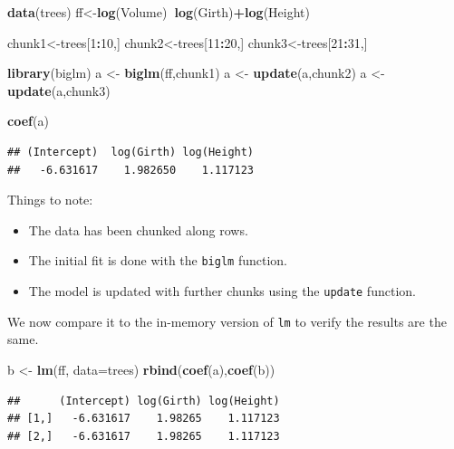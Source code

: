 \documentclass[]{book}
\newenvironment{Shaded}{\begin{snugshade}}{\end{snugshade}}
\newcommand{\KeywordTok}[1]{\textcolor[rgb]{0.13,0.29,0.53}{\textbf{#1}}}
\newcommand{\DataTypeTok}[1]{\textcolor[rgb]{0.13,0.29,0.53}{#1}}
\newcommand{\DecValTok}[1]{\textcolor[rgb]{0.00,0.00,0.81}{#1}}
\newcommand{\StringTok}[1]{\textcolor[rgb]{0.31,0.60,0.02}{#1}}
\newcommand{\OperatorTok}[1]{\textcolor[rgb]{0.81,0.36,0.00}{\textbf{#1}}}
\newcommand{\NormalTok}[1]{#1}
\providecommand{\tightlist}{%
  \setlength{\itemsep}{0pt}\setlength{\parskip}{0pt}}
\theoremstyle{definition}
\theoremstyle{definition}
\theoremstyle{definition}
\theoremstyle{remark}
\begin{document}
\begin{Shaded}
\begin{Highlighting}[]
\KeywordTok{data}\NormalTok{(trees)}
\NormalTok{ff<-}\KeywordTok{log}\NormalTok{(Volume)}\OperatorTok{~}\KeywordTok{log}\NormalTok{(Girth)}\OperatorTok{+}\KeywordTok{log}\NormalTok{(Height)}

\NormalTok{chunk1<-trees[}\DecValTok{1}\OperatorTok{:}\DecValTok{10}\NormalTok{,]}
\NormalTok{chunk2<-trees[}\DecValTok{11}\OperatorTok{:}\DecValTok{20}\NormalTok{,]}
\NormalTok{chunk3<-trees[}\DecValTok{21}\OperatorTok{:}\DecValTok{31}\NormalTok{,]}

\KeywordTok{library}\NormalTok{(biglm)}
\NormalTok{a <-}\StringTok{ }\KeywordTok{biglm}\NormalTok{(ff,chunk1)}
\NormalTok{a <-}\StringTok{ }\KeywordTok{update}\NormalTok{(a,chunk2)}
\NormalTok{a <-}\StringTok{ }\KeywordTok{update}\NormalTok{(a,chunk3)}

\KeywordTok{coef}\NormalTok{(a)}
\end{Highlighting}
\end{Shaded}

\begin{verbatim}
## (Intercept)  log(Girth) log(Height) 
##   -6.631617    1.982650    1.117123
\end{verbatim}

Things to note:

\begin{itemize}
\tightlist
\item
  The data has been chunked along rows.
\item
  The initial fit is done with the \texttt{biglm} function.
\item
  The model is updated with further chunks using the \texttt{update}
  function.
\end{itemize}

We now compare it to the in-memory version of \texttt{lm} to verify the
results are the same.

\begin{Shaded}
\begin{Highlighting}[]
\NormalTok{b <-}\StringTok{ }\KeywordTok{lm}\NormalTok{(ff, }\DataTypeTok{data=}\NormalTok{trees)}
\KeywordTok{rbind}\NormalTok{(}\KeywordTok{coef}\NormalTok{(a),}\KeywordTok{coef}\NormalTok{(b))}
\end{Highlighting}
\end{Shaded}

\begin{verbatim}
##      (Intercept) log(Girth) log(Height)
## [1,]   -6.631617    1.98265    1.117123
## [2,]   -6.631617    1.98265    1.117123
\end{verbatim}
\end{document}
